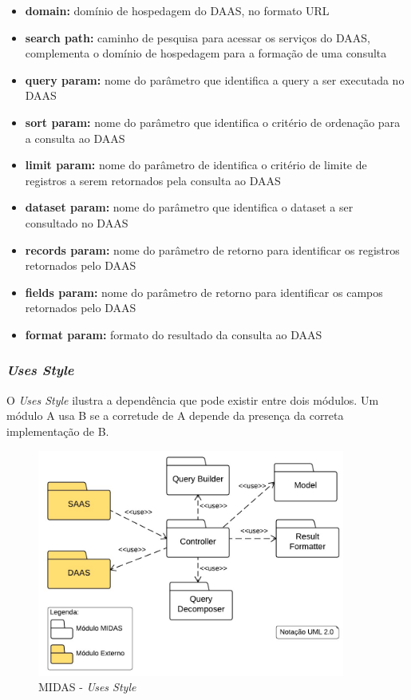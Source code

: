 \documentclass[11pt,a4paper]{article}
\begin{document}
\begin{itemize}
\item \textbf{domain: } domínio de hospedagem do DAAS, no formato URL \item \textbf{search path: } caminho de pesquisa para acessar os serviços do DAAS, complementa o domínio de hospedagem para a formação de uma consulta
\item \textbf{query param: } nome do parâmetro que identifica a query a ser executada no DAAS 
\item \textbf{sort param: } nome do parâmetro que identifica o critério de ordenação para a consulta ao DAAS
\item \textbf{limit param: } nome do parâmetro de identifica o critério de limite de registros a serem retornados pela consulta ao DAAS
\item \textbf{dataset param: } nome do parâmetro que identifica o dataset a ser consultado no DAAS 
\item \textbf{records param: } nome do parâmetro de retorno para identificar os registros retornados pelo DAAS
\item \textbf{fields param: } nome do parâmetro de retorno para identificar os campos retornados pelo DAAS
\item \textbf{format param: } formato do resultado da consulta ao DAAS
\end{itemize}

\subsubsection{\textit{Uses Style}}

O \textit{Uses Style} ilustra a dependência que pode existir entre dois módulos. Um módulo A usa B se a corretude de A depende da presença da correta implementação de B. 

\begin{figure} [h!]
  \centering
    \includegraphics[width=0.9\textwidth]{MIDAS_-_Estilo_Uses}
  \caption{MIDAS - \textit{Uses Style}}
  \label{uses}
\end{figure}
\end{document}
